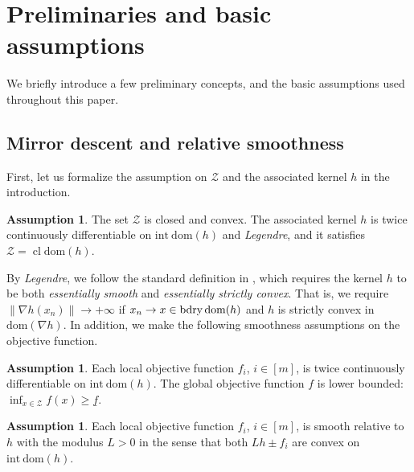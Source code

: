 \documentclass{article}
\theoremstyle{plain}
\theoremstyle{definition}
\newtheorem{assumption}[theorem]{Assumption}
\theoremstyle{remark}
\newcommand{\cl}{\operatorname{cl}}
\newcommand{\sL}{L}
\newcommand{\cZ}{\mathcal{Z}}
\newcommand{\dom}[1]{\mathrm{dom}(#1)}
\newcommand{\idom}[1]{\mathrm{int\ dom}(#1)}
\begin{document}
\section{Preliminaries and basic assumptions}
We briefly introduce a few preliminary concepts, and the basic assumptions used throughout this paper. 

\subsection{Mirror descent and relative smoothness} First, let us formalize the assumption on $\cZ$ and the associated kernel $h$ in the introduction.  
\begin{assumption}
    \label{assump:Legrendre}
    The set $\cZ$ is closed and convex. The associated kernel $h$ is twice continuously differentiable on $\idom{h}$ and \emph{Legendre}, and it satisfies $\mathcal{Z} = \cl\dom{h}$. 
\end{assumption} 
By \emph{Legendre}, we follow the standard definition in \cite{rockafellar1970convex}, which requires the kernel $h$ to be both \emph{essentially smooth} and \emph{essentially strictly convex}. That is, we require $\|\nabla h(x_n)\|\to+\infty$ if $x_n\to x\in{\rm bdry}\, \dom{h}$ and $h$ is strictly convex in $\dom{\nabla h}$. In addition, we make the following smoothness assumptions on the objective function. 

\begin{assumption}
    \label{assump:LowerBound}
    Each local objective function $f_i$, $i\in[m]$, is twice continuously differentiable on $\idom{h}$. The global objective function $f$ is lower bounded: $\inf_{x\in\cZ}f(x)\geq\underline{f}$.
\end{assumption}

\begin{assumption}
    \label{assump:Relative smoothness}
    Each local objective function $f_i$, $i\in[m]$, is smooth relative to $h$ with the modulus ${\sL}>0$ in the sense that both $\sL  h \pm f_i$ are convex on $\idom{h}$.  
\end{assumption}
\end{document}
